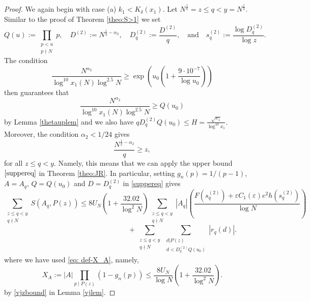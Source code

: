 \documentclass[12pt]{amsart}
\begin{document}
\begin{proof}
We again begin with case (a) $k_1<K_{\delta}(x_1)$. Let $N^{\frac{1}{8}}=z\le q<y=N^{\frac{1}{3}}$. Similar to the proof of Theorem \ref{theo:S>1} we set
\begin{equation} \label{eq: def-Q-D2-D2q-sq}
    Q(u):=\prod_{\substack{p< u\\p\nmid N}} p,\quad D^{(2)}:=N^{\frac{1}{2}-\alpha_2},\quad D^{(2)}_q:=\frac{D^{(2)}}{q}, \quad \text{and} \quad s^{(2)}_q:=\frac{\log D^{(2)}_q}{\log z}.
\end{equation}
The condition
\begin{equation*}
    \frac{N^{\alpha_2}}{\log^{10} x_1(N) \log^{2.5} N}\ge \exp\left(u_0\left(1+\frac{9\cdot 10^{-7}}{\log u_0} \right)\right)
\end{equation*}
then guarantees that
\begin{equation}
\label{cond:N*}
\frac{N^{\alpha_2}}{\log^{10} x_1(N) \log^{2.5} N}\ge Q(u_0)
\end{equation} 
by Lemma \ref{thetauplem} and we also have $qD^{(2)}_qQ(u_0)\le H=\frac{\sqrt{x_1}}{\log^{10}x_1}$. Moreover, the condition $\alpha_2<1/24$ gives
\begin{equation}
\label{cond:N.1*}
\frac{N^{\frac{1}{2}-\alpha_2}}{q}\ge z,
\end{equation} 
for all $z\le q<y$. Namely, this means that we can apply the upper bound $\eqref{suppereq}$ in Theorem \ref{theo:JR}. In particular, setting $g_n(p)=1/(p-1)$, $A=A_q$, $Q=Q(u_0)$ and $D=D^{(2)}_q$ in \eqref{suppereq} gives
\begin{equation}\label{eq:up1}
    \sum_{\substack{z \le q<y\\ q\nmid N}} S(A_q,P(z))\le 8U_N\left( 1+\frac{32.02}{\log^2 N}\right)\sum_{\substack{z \le q < y\\q\nmid N}}\left|A_q\right|\left(\frac{F(s^{(2)}_q)+\varepsilon C_{1}(\varepsilon) e^2 h(s^{(2)}_q)}{\log N}\right)
\end{equation}
\begin{equation*}
    \qquad\qquad\qquad\qquad\qquad\qquad\qquad+\sum_{\substack{z \le q < y\\ q\nmid N}}\sum_{\substack{d|P(z)\\d<D^{(2)}_qQ(u_0)}}\left|r_{q} (d)\right|.
\end{equation*}
where we have used \eqref{eq: def-X_A}, namely,
\begin{equation*}
    X_A:=|A|\prod_{p\mid P(z)}(1-g_n(p))\le \frac{8U_N}{\log N}\left(1+\frac{32.02}{\log^2 N}\right).
\end{equation*}
by \eqref{vjzbound} in Lemma \ref{vjlem}.


\end{proof}
\end{document}

